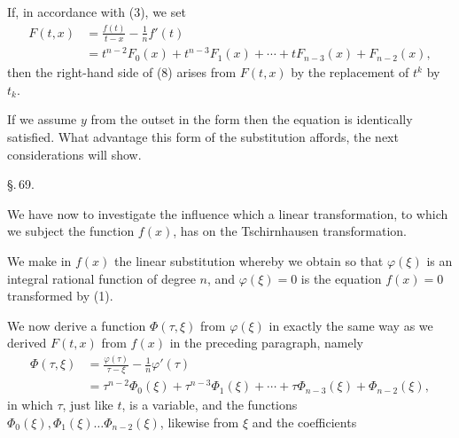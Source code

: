 If, in accordance with (3), we set
\begin{align*}
F(t, x) &= \frac{f(t)}{t-x} - \frac{1}{n} f'(t) \tag{11}\\
&= t^{n-2} F_0(x) + t^{n-3} F_1(x) + \cdots + t F_{n-3}(x) + F_{n-2}(x),
\end{align*}
then the right-hand side of (8) arises from $F(t, x)$ by the
replacement of $t^k$ by $t_k$.

If we assume $y$ from the outset in the form
then the equation
is identically satisfied. What advantage this form of the substitution
affords, the next considerations will show.

\begin{center}
\S.\,69.

\end{center}

We have now to investigate the influence which a linear
transformation, to which we subject the function $f(x)$, has on the
Tschirnhausen transformation.

We make in $f(x)$ the linear substitution
whereby we obtain
so that $\varphi(\xi)$ is an integral rational function of degree $n$, and
$\varphi(\xi) = 0$ is the equation $f(x) = 0$ transformed by (1).

We now derive a function $\Phi(\tau, \xi)$ from $\varphi(\xi)$ in exactly the same
way as we derived $F(t, x)$ from
$f(x)$ in the preceding paragraph, namely
\begin{align*}
\Phi(\tau, \xi) &= \frac{\varphi(\tau)}{\tau - \xi} - \frac{1}{n} \varphi'(\tau) \tag{3}\\
&= \tau^{n-2} \Phi_0(\xi) + \tau^{n-3} \Phi_1(\xi) + \cdots + \tau \Phi_{n-3}(\xi) + \Phi_{n-2}(\xi),
\end{align*}
in which $\tau$, just like $t$, is a variable, and the functions
$\Phi_0(\xi), \Phi_1(\xi) \ldots \Phi_{n-2}(\xi)$, likewise from $\xi$ and the coefficients
